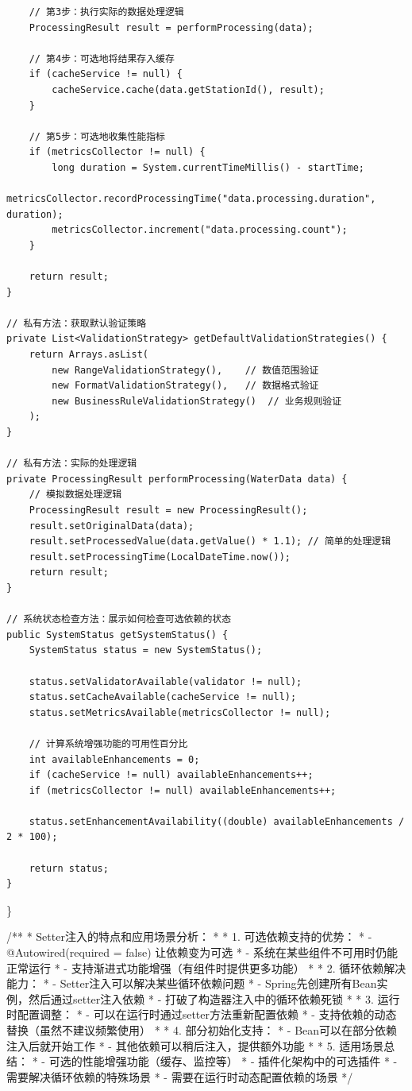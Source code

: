\begin{verbatim}
    // 第3步：执行实际的数据处理逻辑
    ProcessingResult result = performProcessing(data);
    
    // 第4步：可选地将结果存入缓存
    if (cacheService != null) {
        cacheService.cache(data.getStationId(), result);
    }
    
    // 第5步：可选地收集性能指标
    if (metricsCollector != null) {
        long duration = System.currentTimeMillis() - startTime;
        metricsCollector.recordProcessingTime("data.processing.duration", duration);
        metricsCollector.increment("data.processing.count");
    }
    
    return result;
}

// 私有方法：获取默认验证策略
private List<ValidationStrategy> getDefaultValidationStrategies() {
    return Arrays.asList(
        new RangeValidationStrategy(),    // 数值范围验证
        new FormatValidationStrategy(),   // 数据格式验证
        new BusinessRuleValidationStrategy()  // 业务规则验证
    );
}

// 私有方法：实际的处理逻辑
private ProcessingResult performProcessing(WaterData data) {
    // 模拟数据处理逻辑
    ProcessingResult result = new ProcessingResult();
    result.setOriginalData(data);
    result.setProcessedValue(data.getValue() * 1.1); // 简单的处理逻辑
    result.setProcessingTime(LocalDateTime.now());
    return result;
}

// 系统状态检查方法：展示如何检查可选依赖的状态
public SystemStatus getSystemStatus() {
    SystemStatus status = new SystemStatus();
    
    status.setValidatorAvailable(validator != null);
    status.setCacheAvailable(cacheService != null);
    status.setMetricsAvailable(metricsCollector != null);
    
    // 计算系统增强功能的可用性百分比
    int availableEnhancements = 0;
    if (cacheService != null) availableEnhancements++;
    if (metricsCollector != null) availableEnhancements++;
    
    status.setEnhancementAvailability((double) availableEnhancements / 2 * 100);
    
    return status;
}
\end{verbatim}

\}

/** * Setter注入的特点和应用场景分析： * * 1. 可选依赖支持的优势： * - @Autowired(required = false) 让依赖变为可选 * - 系统在某些组件不可用时仍能正常运行 * - 支持渐进式功能增强（有组件时提供更多功能） * * 2. 循环依赖解决能力： * - Setter注入可以解决某些循环依赖问题 * - Spring先创建所有Bean实例，然后通过setter注入依赖 * - 打破了构造器注入中的循环依赖死锁 * * 3. 运行时配置调整： * - 可以在运行时通过setter方法重新配置依赖 * - 支持依赖的动态替换（虽然不建议频繁使用） * * 4. 部分初始化支持： * - Bean可以在部分依赖注入后就开始工作 * - 其他依赖可以稍后注入，提供额外功能 * * 5. 适用场景总结： * - 可选的性能增强功能（缓存、监控等） * - 插件化架构中的可选插件 * - 需要解决循环依赖的特殊场景 * - 需要在运行时动态配置依赖的场景 */

